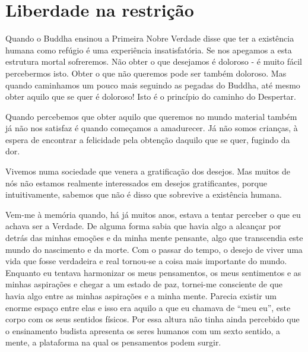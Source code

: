 \chapter{Liberdade na restrição}

Quando o Buddha ensinou a Primeira Nobre Verdade disse que ter a
existência humana como refúgio é uma experiência insatisfatória. Se nos
apegamos a esta estrutura mortal sofreremos. Não obter o que desejamos é
doloroso - é muito fácil percebermos isto. Obter o que não queremos pode
ser também doloroso. Mas quando caminhamos um pouco mais seguindo as
pegadas do Buddha, até mesmo obter aquilo que se quer é doloroso! Isto é
o princípio do caminho do Despertar.

Quando percebemos que obter aquilo que queremos no mundo material também
já não nos satisfaz é quando começamos a amadurecer. Já não somos
crianças, à espera de encontrar a felicidade pela obtenção daquilo que
se quer, fugindo da dor.

Vivemos numa sociedade que venera a gratificação dos desejos. Mas muitos
de nós não estamos realmente interessados em desejos gratificantes,
porque intuitivamente, sabemos que não é disso que sobrevive a
existência humana.

Vem-me à memória quando, há já muitos anos, estava a tentar perceber o
que eu achava ser a Verdade. De alguma forma sabia que havia algo a
alcançar por detrás das minhas emoções e da minha mente pensante, algo
que transcendia este mundo do nascimento e da morte. Com o passar do
tempo, o desejo de viver uma vida que fosse verdadeira e real tornou-se
a coisa mais importante do mundo. Enquanto eu tentava harmonizar os meus
pensamentos, os meus sentimentos e as minhas aspirações e chegar a um
estado de paz, tornei-me consciente de que havia algo entre as minhas
aspirações e a minha mente. Parecia existir um enorme espaço entre elas
e isso era aquilo a que eu chamava de ``meu eu'', este corpo com os seus
sentidos físicos. Por essa altura não tinha ainda percebido que o
ensinamento budista apresenta os seres humanos com um sexto sentido, a
mente, a plataforma na qual os pensamentos podem surgir.

